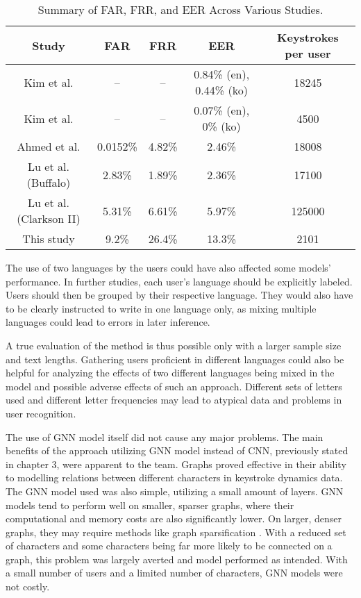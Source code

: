 \begin{center}
	\begin{table}[H]
		\begin{center}
			\begin{tabular}{ |c|c|c|c|c| } 
				\hline
				Study & FAR & FRR & EER & Keystrokes per user \\
				\hline
				Kim et al. \cite{kim2018} & -- & -- & 0.84\% (en), 0.44\% (ko) & 18245 \\
				\hline
				Kim et al. \cite{kim2020} & -- & -- & 0.07\% (en), 0\% (ko) & 4500 \\
				\hline
				Ahmed et al. \cite{ahmed2013} & 0.0152\% & 4.82\% & 2.46\% & 18008 \\
				\hline
				Lu et al. \cite{Lu2020} (Buffalo) & 2.83\% & 1.89\% & 2.36\% & 17100 \\
                \hline
                Lu et al. \cite{Lu2020} (Clarkson II) & 5.31\% & 6.61\% & 5.97\% & 125000 \\
                \hline
				This study & 9.2\% & 26.4\% & 13.3\% & 2101 \\
				\hline
			\end{tabular}
		\end{center}
		\caption{Summary of FAR, FRR, and EER Across Various Studies.}
		\label{table:studies_results}
	\end{table}
\end{center}

The use of two languages by the users could have also affected some models' performance. In further studies, each user's language should be explicitly labeled. Users should then be grouped by their respective language. They would also have to be clearly instructed to write in one language only, as mixing multiple languages could lead to errors in later inference. 

A true evaluation of the method is thus possible only with a larger sample size and text lengths. Gathering users proficient in different languages could also be helpful for analyzing the effects of two different languages being mixed in the model and possible adverse effects of such an approach. Different sets of letters used and different letter frequencies may lead to atypical data and problems in user recognition.

The use of GNN model itself did not cause any major problems. The main benefits of the approach utilizing GNN model instead of CNN, previously stated in chapter 3, were apparent to the team. Graphs proved effective in their ability to modelling relations between different characters in keystroke dynamics data. The GNN model used was also simple, utilizing a small amount of layers. GNN models tend to perform well on smaller, sparser graphs, where their computational and memory costs are also significantly lower. On larger, denser graphs, they may require methods like graph sparsification \cite{zhang2024graphsparsificationmixturegraphs}. With a reduced set of characters and some characters being far more likely to be connected on a graph, this problem was largely averted and model performed as intended. With a small number of users and a limited number of characters, GNN models were not costly.